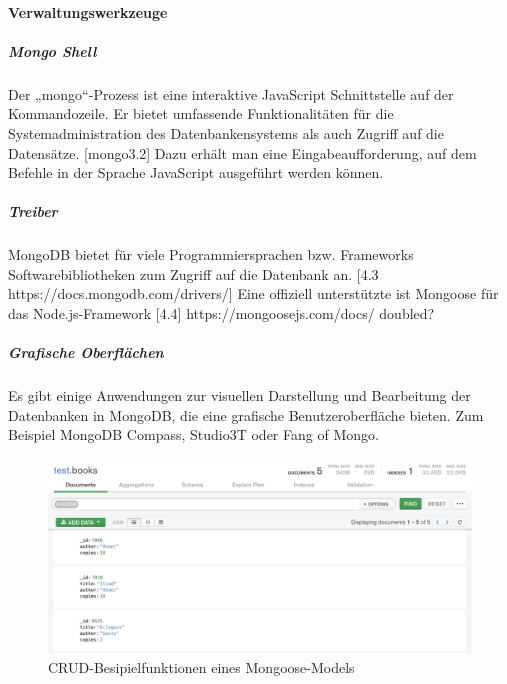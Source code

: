\paragraph{Verwaltungswerkzeuge}
\subparagraph{Mongo Shell}
Der „mongo“-Prozess ist eine interaktive JavaScript Schnittstelle auf der Kommandozeile. Er bietet umfassende Funktionalitäten für die Systemadministration des Datenbankensystems als auch Zugriff auf die Datensätze. [mongo3.2] Dazu erhält man eine Eingabeaufforderung, auf dem Befehle in der Sprache JavaScript ausgeführt werden können.
\subparagraph{Treiber}
MongoDB bietet für viele Programmiersprachen bzw. Frameworks Softwarebibliotheken zum Zugriff auf die Datenbank an. [4.3 https://docs.mongodb.com/drivers/]  Eine offiziell unterstützte ist Mongoose für das Node.js-Framework [4.4] https://mongoosejs.com/docs/ doubled?
\newpage
\subparagraph{Grafische Oberflächen}
Es gibt einige Anwendungen zur visuellen Darstellung und Bearbeitung der Datenbanken in MongoDB, die eine grafische Benutzeroberfläche bieten. Zum Beispiel MongoDB Compass, Studio3T oder Fang of Mongo. 


\begin{figure}[h]
\centering
\includegraphics[width=15cm]{images/mongodb_compass.png}
\caption{CRUD-Besipielfunktionen eines Mongoose-Models}
\end{figure}